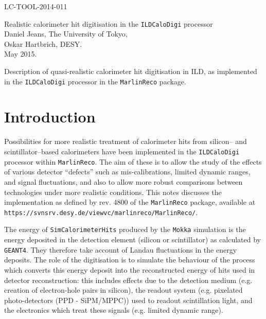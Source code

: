 \documentclass[12pt]{article} %
\begin{document}
{
\flushright
LC-TOOL-2014-011\\
}

\vspace{0.5cm}

{
\center
\Huge
Realistic calorimeter hit digitisation in the {\tt ILDCaloDigi} processor\\
}
%
\vspace{1cm}
%
{
\center
\Large
Daniel Jeans, The University of Tokyo, \\
Oskar Hartbrich, DESY.\\
}
%
\vspace{1cm}
%
{
 May 2015.\\
}

\vspace{1cm}

{
\center
Description of quasi-realistic calorimeter hit digitisation in ILD, as implemented in
the {\tt ILDCaloDigi} processor in the {\tt MarlinReco} package.
}


\section{Introduction}

Possibilities for more realistic treatment of calorimeter hits from silicon-- and scintillator--based calorimeters have been
implemented in the {\tt ILDCaloDigi} processor within {\tt MarlinReco}. The aim of these is to allow the study of the effects
of various detector ``defects'' such as mis-calibrations, limited dynamic ranges, and signal fluctuations,
and also to allow more robust comparisons between technologies under more realistic conditions.
This notes discusses the implementation as defined by rev. 4800 of the {\tt MarlinReco} package, available at
{\tt https://svnsrv.desy.de/viewvc/marlinreco/MarlinReco/}.

The energy of {\tt SimCalorimeterHits} produced by the {\tt Mokka} simulation is the energy deposited in the detection
element (silicon or scintillator) as calculated by {\tt GEANT4}. They therefore take account of Landau fluctuations
in the energy deposits.
The role of the digitisation is to simulate the behaviour of the process which converts this energy deposit into the
reconstructed energy of hits used in detector reconstruction: this includes effects due to the detection medium
(e.g. creation of electron-hole pairs in silicon),
the readout system (e.g. pixelated photo-detectors (PPD - SiPM/MPPC)) used to readout scintillation light,
and the electronics which treat these signals (e.g. limited dynamic range).
\end{document}
